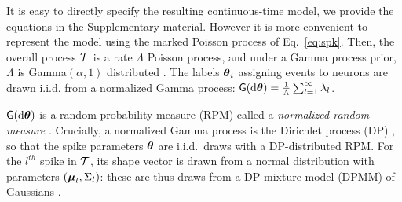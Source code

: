 % 
It is easy to directly specify the resulting continuous-time model, we provide the equations in the Supplementary material. 
However it is more convenient to represent the model using the marked Poisson process of Eq.~\eqref{eq:spk}. %
Then, the overall process $\mathcal{T}$ is a rate $\Lambda$ Poisson process,
and under a Gamma process prior, $\Lambda$ is Gamma$(\alpha,1)$ distributed %
\citep{Ferguson73}.
The labels $\boldsymbol{\theta}_i$ assigning events to neurons are drawn i.i.d. from a normalized Gamma 
process: %
$ \mathsf{G}(\mathrm{d} \boldsymbol{\theta}) = \frac{1}{\Lambda} \sum_{l=1}^{\infty} \lambda_l$.

$\mathsf{G}(\mathrm{d} \boldsymbol{\theta})$ is a random probability measure (RPM) called a \emph{normalized random measure} \citep{JamesLP09}. Crucially, a 
normalized Gamma process is the Dirichlet process (DP) \citep{Ferguson73}, so that 
the spike parameters $\boldsymbol{\theta}$ are i.i.d.\ draws with a DP-distributed RPM.
For the $l^{th}$ spike in $\mathcal{T}$, its shape vector is drawn from a normal distribution
with parameters $(\boldsymbol{\mu}_{l}, \Sigma_{l})$: these are thus
draws from a DP mixture model (DPMM) of Gaussians \citep{Lo1984}.

